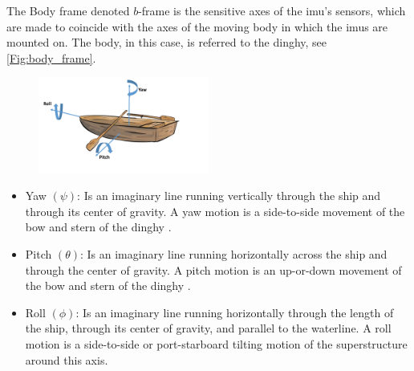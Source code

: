 The Body frame denoted $b$-frame is the sensitive axes of the \gls{imu}'s sensors, which are made to coincide with the axes of the moving body in which the \gls{imu}s are mounted on. The body, in this case, is referred to the dinghy, see \autoref{Fig:body_frame}.
\begin{figure}[H]
\centering
\includegraphics[width=0.5\textwidth]{Figures/Euler_angle.pdf}
\label{Fig:body_frame}
\end{figure}

\begin{itemize}
\item Yaw $(\psi)$: Is an imaginary line running vertically through the ship and through its center of gravity. A yaw motion is a side-to-side movement of the bow and stern of the dinghy \cite{SNAME}.
\item Pitch $(\theta)$: Is an imaginary line running horizontally across the ship and through the center of gravity. A pitch motion is an up-or-down movement of the bow and stern of the dinghy \cite{SNAME}.
\item Roll $(\phi)$: Is an imaginary line running horizontally through the length of the ship, through its center of gravity, and parallel to the waterline. A roll motion is a side-to-side or port-starboard tilting motion of the superstructure around this axis\cite{SNAME}.
\end{itemize}

